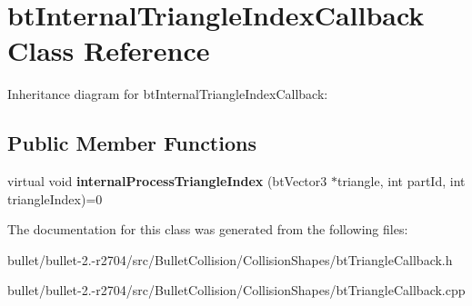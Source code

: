 \hypertarget{classbt_internal_triangle_index_callback}{\section{bt\+Internal\+Triangle\+Index\+Callback Class Reference}
\label{classbt_internal_triangle_index_callback}
}


Inheritance diagram for bt\+Internal\+Triangle\+Index\+Callback\+:
\subsection*{Public Member Functions}
\begin{DoxyCompactItemize}
\item 
\hypertarget{classbt_internal_triangle_index_callback_a4fceb775c86c2d63b41ad9be24ee7fd5}{virtual void {\bfseries internal\+Process\+Triangle\+Index} (bt\+Vector3 $\ast$triangle, int part\+Id, int triangle\+Index)=0}\label{classbt_internal_triangle_index_callback_a4fceb775c86c2d63b41ad9be24ee7fd5}

\end{DoxyCompactItemize}


The documentation for this class was generated from the following files\+:\begin{DoxyCompactItemize}
\item 
bullet/bullet-\/2.-\/r2704/src/\+Bullet\+Collision/\+Collision\+Shapes/bt\+Triangle\+Callback.\+h\item 
bullet/bullet-\/2.-\/r2704/src/\+Bullet\+Collision/\+Collision\+Shapes/bt\+Triangle\+Callback.\+cpp\end{DoxyCompactItemize}
